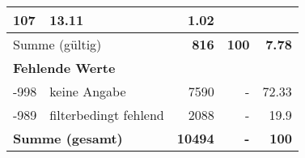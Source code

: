 \begin{longtable}{lXrrr}
       \num{107} &
       \num[round-mode=places,round-precision=2]{13.11} &
         \num[round-mode=places,round-precision=2]{1.02} \\
     \midrule
     \multicolumn{2}{l}{Summe (gültig)} &
       \textbf{\num{816}} &
     \textbf{\num{100}} &
       \textbf{\num[round-mode=places,round-precision=2]{7.78}} \\
     \multicolumn{5}{l}{\textbf{Fehlende Werte}}\\
       -998 &
       keine Angabe &
         \num{7590} &
        - &
         \num[round-mode=places,round-precision=2]{72.33} \\
       -989 &
       filterbedingt fehlend &
         \num{2088} &
        - &
         \num[round-mode=places,round-precision=2]{19.9} \\
     \midrule
     \multicolumn{2}{l}{\textbf{Summe (gesamt)}} &
          \textbf{\num{10494}} &
        \textbf{-} &
        \textbf{\num{100}} \\
     \bottomrule
     \end{longtable}
     
